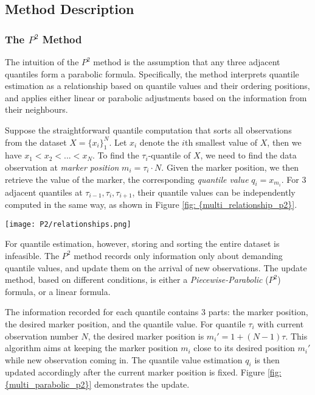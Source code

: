 \subsection{Method Description}

\subsubsection{The $P^2$ Method}
\label{subsubsec: description_{p2}}

The intuition of the $P^2$ method is the assumption that any three adjacent quantiles form a parabolic formula.
Specifically, the method interprets quantile estimation as a relationship based on quantile values and their ordering positions, and applies either linear or parabolic adjustments based on the information from their neighbours.

Suppose the straightforward quantile computation that sorts all observations from the dataset $X = \{x_i\}^N_1$. Let $x_i$ denote the $i$th smallest value of $X$, then we have $x_1 < x_2 < ... < x_N$. 
To find the $\tau_i$-quantile of $X$, we need to find the data observation at \textit{marker position} $m_i = \tau_i \cdot N$. Given the marker position, we then retrieve the value of the marker, the corresponding \textit{quantile value} $q_i = x_{m_i}$. 
For 3 adjacent quantiles at $\tau_{i-1}, \tau_i, \tau_{i+1}$, their quantile values can be independently computed in the same way, as shown in Figure \ref{fig: {multi_relationship_p2}}.

\begin{figure*}[h!]
	\texttt{[image: P2/relationships.png]}
    \caption{Relationship between $\tau$ value, marker position and quantile values correspondingly for 3 adjacent quantiles}
    \label{fig: {multi_relationship_p2}}
\end{figure*}

For quantile estimation, however, storing and sorting the entire dataset is infeasible. The $P^2$ method records only information only about demanding quantile values, and update them on the arrival of new observations. The update method, based on different conditions, is either a \textit{Piecewise-Parabolic} ($P^2$) formula, or a linear formula.

The information recorded for each quantile contains 3 parts: the marker position, the desired marker position, and the quantile value. For quantile $\tau_i$ with current observation number $N$, the desired marker position is $m_i \prime = 1 + (N-1)\tau$. This algorithm aims at keeping the marker position $m_i$ close to its desired position $m_i \prime$ while new observation coming in. The quantile value estimation $q_i$ is then updated accordingly after the current marker position is fixed. Figure \ref{fig: {multi_parabolic_p2}} demonstrates the update.

